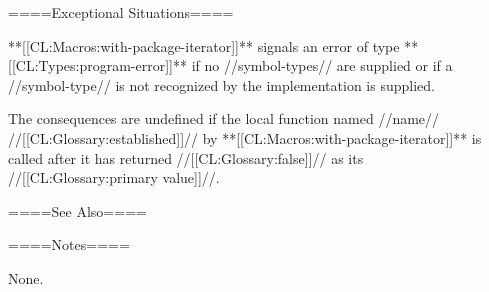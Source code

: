 ====Exceptional Situations====

**[[CL:Macros:with-package-iterator]]** signals an error of type **[[CL:Types:program-error]]** if no //symbol-types// are supplied or if a //symbol-type// is not recognized by the implementation is supplied.

The consequences are undefined if the local function named //name// //[[CL:Glossary:established]]// by **[[CL:Macros:with-package-iterator]]** is called after it has returned //[[CL:Glossary:false]]// as its //[[CL:Glossary:primary value]]//.

====See Also====

{\secref\TraversalRules}

====Notes====

None.

  
